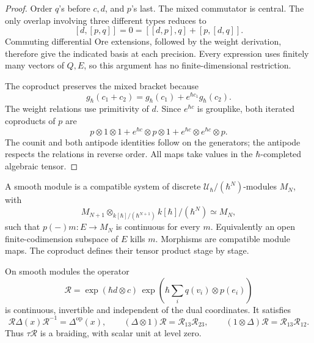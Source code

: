 \begin{proof}
Order \(q\)'s before \(c,d\), and \(p\)'s last.
The mixed commutator is central. The only overlap involving
three different types reduces to
\[
 [d,[p,q]]=0=[[d,p],q]+[p,[d,q]].
\]
Commuting differential Ore extensions, followed by the weight
derivation, therefore give the indicated basis at each precision.
Every expression uses finitely many vectors of \(Q,E\), so this
argument has no finite-dimensional restriction.

The coproduct preserves the mixed bracket because
\[
 g_\hbar(c_1+c_2)
 =g_\hbar(c_1)+e^{\hbar c_1}g_\hbar(c_2).
\]
The weight relations use primitivity of \(d\).
Since \(e^{\hbar c}\) is grouplike, both iterated coproducts
of \(p\) are
\[
 p\otimes1\otimes1+e^{\hbar c}\otimes p\otimes1
                   +e^{\hbar c}\otimes e^{\hbar c}\otimes p.
\]
The counit and both antipode identities follow on the generators;
the antipode respects the relations in reverse order.
All maps take values in the \(\hbar\)-completed algebraic tensor.
\end{proof}

A smooth module is a compatible system of discrete
\(\mathcal U_\hbar/(\hbar^N)\)-modules \(M_N\), with
\[
 M_{N+1}\otimes_{k[\hbar]/(\hbar^{N+1})}k[\hbar]/(\hbar^N)
 \simeq M_N,
\]
such that \(p(-)m:E\to M_N\) is continuous for every \(m\).
Equivalently an open finite-codimension subspace of \(E\)
kills \(m\). Morphisms are compatible module maps.
The coproduct defines their tensor product stage by stage.

\begin{theorem}\label{cyrep:thm:oscillator-exchange}
On smooth modules the operator
\begin{equation}\label{cyrep:eq:oscillator-R}
 \mathcal R=
 \exp(\hbar d\otimes c)\,
 \exp\left(\hbar\sum_iq(v_i)\otimes p(e_i)\right)
\end{equation}
is continuous, invertible and independent of the dual coordinates.
It satisfies
\[
 \mathcal R\Delta(x)\mathcal R^{-1}=\Delta^{\mathrm{op}}(x),\qquad
 (\Delta\otimes1)\mathcal R=\mathcal R_{13}\mathcal R_{23},
 \qquad
 (1\otimes\Delta)\mathcal R=\mathcal R_{13}\mathcal R_{12}.
\]
Thus \(\tau\mathcal R\) is a braiding, with scalar unit at level zero.
\end{theorem}


